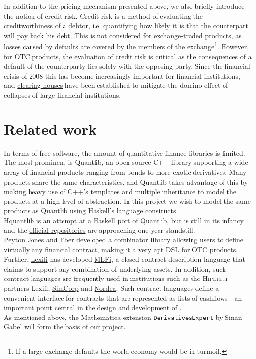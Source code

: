 In addition to the pricing mechanism presented above, we also briefly introduce
the notion of credit risk. Credit risk is a method of evaluating the creditworthiness
of a debtor, i.e. quantifying how likely it is that the counterpart will pay back 
his debt. This is not considered for exchange-traded products, as losses 
caused by defaults are covered by the members of the exchange\footnote{If a large 
exchange defaults the world economy would be in turmoil.}. However, for OTC
products, the evaluation of credit risk is critical as the consequences of a 
default of the counterparty lies solely with the opposing party. Since the 
financial crisis of 2008 this has become increasingly important for financial 
institutions, and \href{http://www.lchclearnet.com/}{clearing houses} have
been established to mitigate the 
domino effect of collapses of large financial institutions.

\section{Related work}

In terms of free software, the amount of quantitative finance libraries is 
limited.
The most prominent is Quantlib, an open-source C++ library\cite{Ame2003}
supporting a wide array of financial products ranging from bonds to more 
exotic derivatives. Many products share the same characteristics, and
Quantlib takes advantage of this by making heavy use of C++'s templates 
and multiple  inheritance to model the products at a high level of 
abstraction\cite{implql}.
In this project we wish to model the same products as Quantlib using Haskell's
language constructs.\\

Hquantlib\cite{hquantlib} is an attempt at a Haskell port of Quantlib,
but is still in its infancy and the
\href{https://github.com/paulrzcz/hquantlib/tree/master}{official repositories}
are approaching one year standstill.\\

Peyton Jones and Eber\cite{composingcontracts} developed a combinator library 
allowing users to define virtually any financial contract, making it a very
apt DSL for OTC products. Further, \href{http://www.lexifi.com/}{Lexifi} has developed 
\href{http://www.lexifi.com/product/technology/contract-description-language}{MLFi},
a closed contract description language that claims to support any combination of
underlying assets. In addition, such contract languages are frequently used in
institutions such as the \textsc{Hiperfit} partners Lexifi,
\href{www.simcorp.com}{SimCorp} and \href{www.nordea.com}{Nordea}. Such contract 
languages define a convenient
interface for contracts that are represented as lists of cashflows - an
important point central in the design and development of \hql.\\

As mentioned above, the Mathematica extension
\texttt{DerivativesExpert}\cite{Mathematica:DerivativesExpert} by Sinan Gabel
will form the basis of our project.
